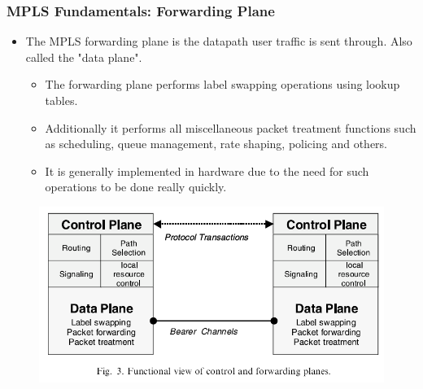\documentclass[12pt]{beamer}
\begin{document}
\begin{frame}
  \frametitle{MPLS Fundamentals: Forwarding Plane}
  \begin{itemize}
    \item The MPLS forwarding plane is the datapath user traffic is sent through. Also called the "data plane".
    \begin{itemize}
      \item The forwarding plane performs label swapping operations using lookup tables.
      \item Additionally it performs all miscellaneous packet treatment functions such as scheduling, queue management, rate shaping, policing and others.
      \item It is generally implemented in hardware due to the need for such operations to be done really quickly.
    \end{itemize}
  \end{itemize}
  \begin{figure}[h]
    \begin{center}
      \includegraphics[scale=0.35]{label.png}
    \end{center}
  \end{figure}    
\end{frame}
\end{document}
